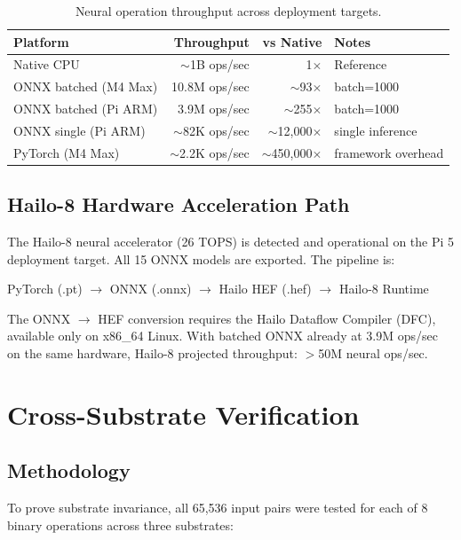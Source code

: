 \documentclass[11pt,a4paper]{article}
\begin{document}
\begin{table}[h]
\centering
\begin{tabular}{lrrl}
\toprule
\textbf{Platform} & \textbf{Throughput} & \textbf{vs Native} & \textbf{Notes} \\
\midrule
Native CPU & ${\sim}$1B ops/sec & 1$\times$ & Reference \\
ONNX batched (M4 Max) & 10.8M ops/sec & ${\sim}$93$\times$ & batch=1000 \\
ONNX batched (Pi ARM) & 3.9M ops/sec & ${\sim}$255$\times$ & batch=1000 \\
ONNX single (Pi ARM) & ${\sim}$82K ops/sec & ${\sim}$12,000$\times$ & single inference \\
PyTorch (M4 Max) & ${\sim}$2.2K ops/sec & ${\sim}$450,000$\times$ & framework overhead \\
\bottomrule
\end{tabular}
\caption{Neural operation throughput across deployment targets.}
\end{table}

\subsection{Hailo-8 Hardware Acceleration Path}

The Hailo-8 neural accelerator (26 TOPS) is detected and operational on the Pi 5 deployment target. All 15 ONNX models are exported. The pipeline is:

\begin{center}
PyTorch (.pt) $\to$ ONNX (.onnx) $\to$ Hailo HEF (.hef) $\to$ Hailo-8 Runtime
\end{center}

The ONNX $\to$ HEF conversion requires the Hailo Dataflow Compiler (DFC), available only on x86\_64 Linux. With batched ONNX already at 3.9M ops/sec on the same hardware, Hailo-8 projected throughput: $>$50M neural ops/sec.

\section{Cross-Substrate Verification}

\subsection{Methodology}

To prove substrate invariance, all 65,536 input pairs were tested for each of 8 binary operations across three substrates:
\end{document}
